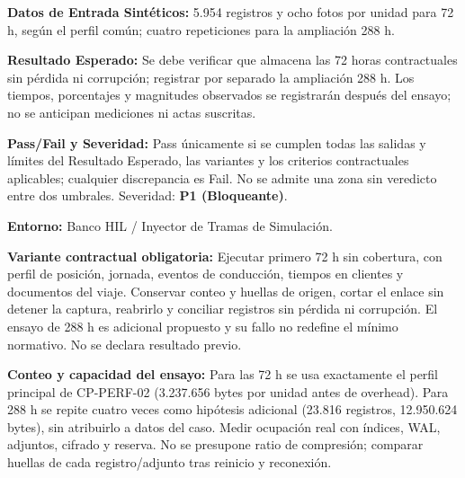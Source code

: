 \par\noindent\textbf{Datos de Entrada Sintéticos:} 5.954 registros y ocho fotos por unidad para 72 h, según el perfil común; cuatro repeticiones para la ampliación 288 h.\par
\par\noindent\textbf{Resultado Esperado:} Se debe verificar que almacena las 72 horas contractuales sin pérdida ni corrupción; registrar por separado la ampliación 288 h. Los tiempos, porcentajes y magnitudes observados se registrarán después del ensayo; no se anticipan mediciones ni actas suscritas.\par
\par\noindent\textbf{Pass/Fail y Severidad:} Pass únicamente si se cumplen todas las salidas y límites del Resultado Esperado, las variantes y los criterios contractuales aplicables; cualquier discrepancia es Fail. No se admite una zona sin veredicto entre dos umbrales. Severidad: \textbf{P1 (Bloqueante)}.\par
\par\noindent\textbf{Entorno:} Banco HIL / Inyector de Tramas de Simulación.\par

\par\noindent\textbf{Variante contractual obligatoria:} Ejecutar primero 72 h sin cobertura, con perfil de posición, jornada, eventos de conducción, tiempos en clientes y documentos del viaje. Conservar conteo y huellas de origen, cortar el enlace sin detener la captura, reabrirlo y conciliar registros sin pérdida ni corrupción. El ensayo de 288 h es adicional propuesto y su fallo no redefine el mínimo normativo. No se declara resultado previo.\par

\par\noindent\textbf{Conteo y capacidad del ensayo:} Para las 72 h se usa exactamente el perfil principal de CP-PERF-02 (3.237.656 bytes por unidad antes de overhead). Para 288 h se repite cuatro veces como hipótesis adicional (23.816 registros, 12.950.624 bytes), sin atribuirlo a datos del caso. Medir ocupación real con índices, WAL, adjuntos, cifrado y reserva. No se presupone ratio de compresión; comparar huellas de cada registro/adjunto tras reinicio y reconexión.\par

